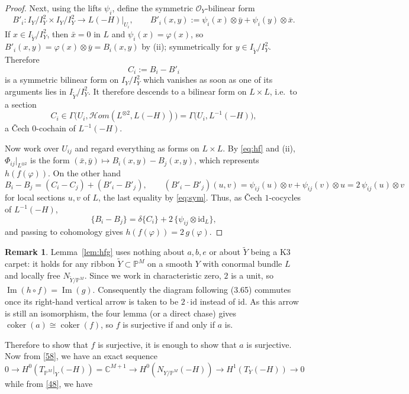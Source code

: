 \documentclass[11pt,twoside]{amsart}
\theoremstyle{plain}
\numberwithin{equation}{section}
\theoremstyle{definition}
\newtheorem{remark}[theorem]{Remark}
\begin{document}
\begin{proof}
Next, using the lifts $\psi_i$, define the symmetric $\mathcal{O}_Y$-bilinear form
\[
B'_i\colon I_Y/I_Y^2\times I_Y/I_Y^2\longrightarrow L(-H)\big|_{U_i},\qquad
B'_i(x,y):=\psi_i(x)\otimes\bar y+\psi_i(y)\otimes\bar x .
\]
If $x\in I_{\widetilde Y}/I_Y^2$, then $\bar x=0$ in $L$ and $\psi_i(x)=\varphi(x)$, so
$B'_i(x,y)=\varphi(x)\otimes\bar y=B_i(x,y)$ by (ii); symmetrically for $y\in I_{\widetilde Y}/I_Y^2$.
Therefore
\[
C_i:=B_i-B'_i
\]
is a symmetric bilinear form on $I_Y/I_Y^2$ which vanishes as soon as one of its arguments lies
in $I_{\widetilde Y}/I_Y^2$. It therefore descends to a bilinear form on $L\times L$, i.e.\ to a section
\[
C_i\in\Gamma\big(U_i,\mathcal{H}om(L^{\otimes 2},L(-H))\big)=\Gamma\big(U_i,L^{-1}(-H)\big),
\]
a \v{C}ech $0$-cochain of $L^{-1}(-H)$.

Now work over $U_{ij}$ and regard everything as forms on $L\times L$. By \eqref{eq:hf} and (ii),
$\Phi_{ij}|_{L^{\otimes 2}}$ is the form $(\bar x,\bar y)\mapsto B_i(x,y)-B_j(x,y)$, which represents
$h(f(\varphi))$. On the other hand
\[
B_i-B_j=(C_i-C_j)+(B'_i-B'_j),
\qquad
(B'_i-B'_j)(u,v)=\psi_{ij}(u)\otimes v+\psi_{ij}(v)\otimes u=2\,\psi_{ij}(u)\otimes v
\]
for local sections $u,v$ of $L$, the last equality by \eqref{eq:sym}. Thus, as \v{C}ech $1$-cocycles
of $L^{-1}(-H)$,
\[
\{B_i-B_j\}=\delta\{C_i\}+2\,\{\psi_{ij}\otimes\mathrm{id}_L\},
\]
and passing to cohomology gives $h(f(\varphi))=2\,g(\varphi)$.
\end{proof}

\begin{remark}
Lemma~\ref{lem:hfg} uses nothing about $a,b,e$ or about $\widetilde Y$ being a K3 carpet: it holds
for any ribbon $\widetilde Y\subset\mathbb{P}^M$ on a smooth $Y$ with conormal bundle $L$ and locally
free $N_{\widetilde Y/\mathbb{P}^M}$. Since we work in characteristic zero, $2$ is a unit, so
$\operatorname{Im}(h\circ f)=\operatorname{Im}(g)$. Consequently the diagram following (3.65) commutes
once its right-hand vertical arrow is taken to be $2\cdot\mathrm{id}$ instead of $\mathrm{id}$. As this
arrow is still an isomorphism, the four lemma (or a direct chase) gives
$\operatorname{coker}(a)\cong\operatorname{coker}(f)$, so $f$ is surjective if and only if $a$ is.
\end{remark}
\color{black}
Therefore to show that $f$ is surjective, it is enough to show that $a$ is surjective. Now from \ref{58}, we have an exact sequence
\begin{equation}\label{66}
0 \to H^0(T_{\mathbb{P}^M}|_Y (-H)) = \mathbb{C}^{M+1} \to H^0(N_{Y/\mathbb{P}^M}(-H)) \to H^1(T_Y(-H)) \to 0
\end{equation}
while from \ref{48}, we have
\end{document}
